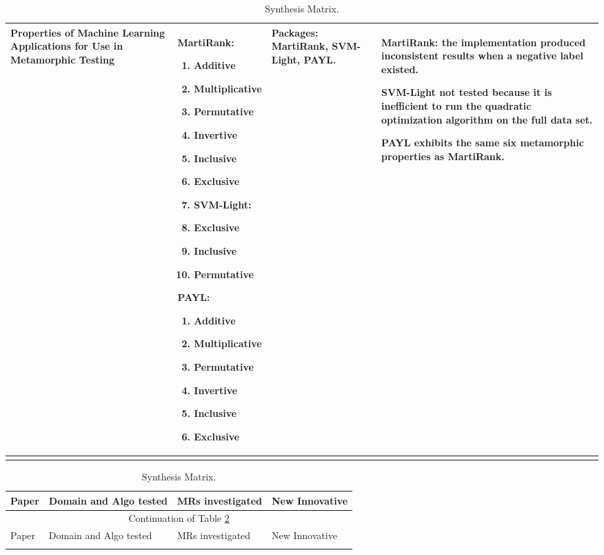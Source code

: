 \begin{singlespace}
\begin{longtable}[c]{| p{3cm} | p{5cm} | p{3cm} | p{3cm} |}
  Properties of Machine Learning Applications for Use in Metamorphic Testing &
  MartiRank:
  \begin{enumerate}
   \item Additive
   \item Multiplicative
   \item Permutative
   \item Invertive
   \item Inclusive
   \item Exclusive
   \item SVM-Light:
   \item Exclusive
   \item Inclusive
   \item Permutative
  \end{enumerate}
  \par\medskip
  PAYL:
  \begin{enumerate}
   \item Additive
   \item Multiplicative
   \item Permutative
   \item Invertive
   \item Inclusive
   \item Exclusive
  \end{enumerate}                                                  &
  Packages: MartiRank, SVM-Light, PAYL.                                      &
  MartiRank: the implementation produced inconsistent results when a negative label existed.\par\medskip
  SVM-Light not tested because it is inefficient to run the quadratic optimization algorithm on the full data set.\par\medskip
  PAYL exhibits the same six metamorphic properties as MartiRank.                                                              \\

  \hline

  \caption{Synthesis Matrix.\label{long}}
 \end{longtable}

 \begin{longtable}[c]{| p{3cm} | p{5cm} | p{3cm} | p{3cm} |}
  \hline

  Paper & Domain and Algo tested  & MRs investigated & New Innovative \\
  \hline
  \endfirsthead
  \hline
  \multicolumn{4}{|c|}{Continuation of Table \ref{long}}                                                                       \\
  \hline
  Paper & Domain and Algo tested  & MRs investigated & New Innovative \\
  \hline
  \endhead
  \caption{Synthesis Matrix.\label{long}}
  \endfoot


\end{longtable}
\end{singlespace}
